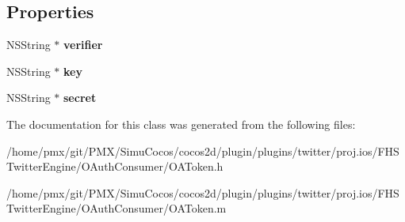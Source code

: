 \subsection*{Properties}
\begin{DoxyCompactItemize}
\item 
\mbox{\label{interfaceOAToken_ab107d296282fd7d9a53d6dc15f8122e1}} 
N\+S\+String $\ast$ {\bfseries verifier}
\item 
\mbox{\label{interfaceOAToken_a85877f70aa3c017066a29bed39b6365b}} 
N\+S\+String $\ast$ {\bfseries key}
\item 
\mbox{\label{interfaceOAToken_a29b03ca2382d8b4bf8aa8dc285f7205c}} 
N\+S\+String $\ast$ {\bfseries secret}
\end{DoxyCompactItemize}


The documentation for this class was generated from the following files\+:\begin{DoxyCompactItemize}
\item 
/home/pmx/git/\+P\+M\+X/\+Simu\+Cocos/cocos2d/plugin/plugins/twitter/proj.\+ios/\+F\+H\+S\+Twitter\+Engine/\+O\+Auth\+Consumer/O\+A\+Token.\+h\item 
/home/pmx/git/\+P\+M\+X/\+Simu\+Cocos/cocos2d/plugin/plugins/twitter/proj.\+ios/\+F\+H\+S\+Twitter\+Engine/\+O\+Auth\+Consumer/O\+A\+Token.\+m\end{DoxyCompactItemize}

